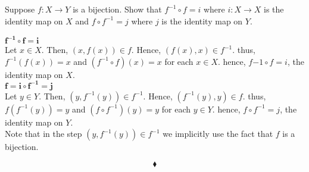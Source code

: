 \subsection{}
\begin{tcolorbox}
Suppose $f:X\rightarrow Y$ is a bijection. Show that $f^{-1}\circ f=i$ where $i:X\rightarrow X$ is the identity map on $X$ and $f\circ f^{-1}=j$ where $j$ is the identity map on $Y$.
\end{tcolorbox}
$$ $$ 
$\mathbf{f^{-1}\circ f=i}$\\
Let $x\in X$. Then, $\left(x,f(x)\right) \in f$. Hence, $\left(f(x),x\right) \in f^{-1}$. thus, $f^{-1}\left(f(x)\right)= x$ and $\left(f^{-1}\circ f\right)(x)= x$ for each $x\in X$. hence, $f{-1}\circ f = i$, the identity map on $ X$. \\
$\mathbf{f=i\circ f^{-1}=j}$\\
Let $y\in Y$. Then, $\left(y,f^{-1}(y)\right) \in f^{-1}$. Hence, $\left(f^{-1}(y),y\right) \in f$. thus, $f\left(f^{-1}(y)\right)= y$ and $\left(f\circ f^{-1}\right)(y)= y$ for each $y\in Y$. hence, $f\circ f^{-1} = j$, the identity map on $ Y$.\\
Note that in the step  \textit{$\left(y,f^{-1}(y)\right) \in f^{-1}$} we implicitly use the fact that $f$ is a bijection.
 
$$\blacklozenge$$


